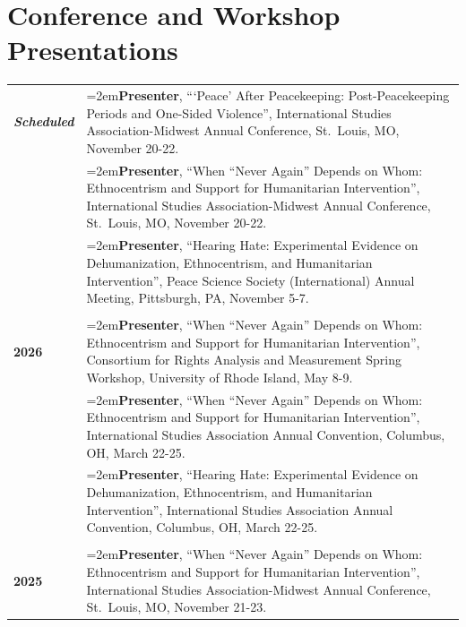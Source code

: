 \documentclass[letterpaper,12pt]{article}
\begin{document}
\section{Conference and Workshop Presentations}
\begin{xltabular}{\dimexpr\textwidth-0in}{p{1.5in}X}

\textbf{\textit{Scheduled}} 	& \hangindent=2em\textbf{Presenter}, ```Peace' After Peacekeeping: Post-Peacekeeping Periods and One-Sided Violence”, International Studies \mbox{Association-Midwest} Annual \mbox{Conference}, \mbox{St. Louis}, MO, November 20-22.\\

					& \hangindent=2em\textbf{Presenter}, ``When “Never Again” Depends on Whom: Ethnocentrism and Support for \mbox{Humanitarian} Intervention”, International Studies \mbox{Association-Midwest} Annual \mbox{Conference}, \mbox{St. Louis}, MO, November 20-22.\\
					
					& \hangindent=2em\textbf{Presenter}, ``Hearing Hate: Experimental Evidence on Dehumanization, \mbox{Ethnocentrism}, and Humanitarian Intervention”, Peace Science Society \mbox{(International)} Annual Meeting, Pittsburgh, PA, November 5-7.\\ \\

\textbf{2026}			& \hangindent=2em\textbf{Presenter}, ``When “Never Again” Depends on Whom: Ethnocentrism and \mbox{Support} for Humanitarian Intervention”, Consortium for Rights Analysis and Measurement Spring Workshop, University of Rhode Island, May 8-9.\\

                     			& \hangindent=2em\textbf{Presenter}, ``When “Never Again” Depends on Whom: Ethnocentrism and \mbox{Support} for Humanitarian Intervention”, International Studies Association Annual Convention, Columbus, OH, March 22-25.\\
                     
                     			& \hangindent=2em\textbf{Presenter}, ``Hearing Hate: Experimental Evidence on Dehumanization, \mbox{Ethnocentrism}, and Humanitarian Intervention”, International Studies \mbox{Association} Annual Convention, Columbus, OH, March 22-25.\\ \\

\textbf{2025} 			& \hangindent=2em\textbf{Presenter}, ``When “Never Again” Depends on Whom: Ethnocentrism and Support for \mbox{Humanitarian} Intervention”, International Studies \mbox{Association-Midwest} Annual \mbox{Conference}, \mbox{St. Louis}, MO, November 21-23.\\


\end{xltabular}
\end{document}

